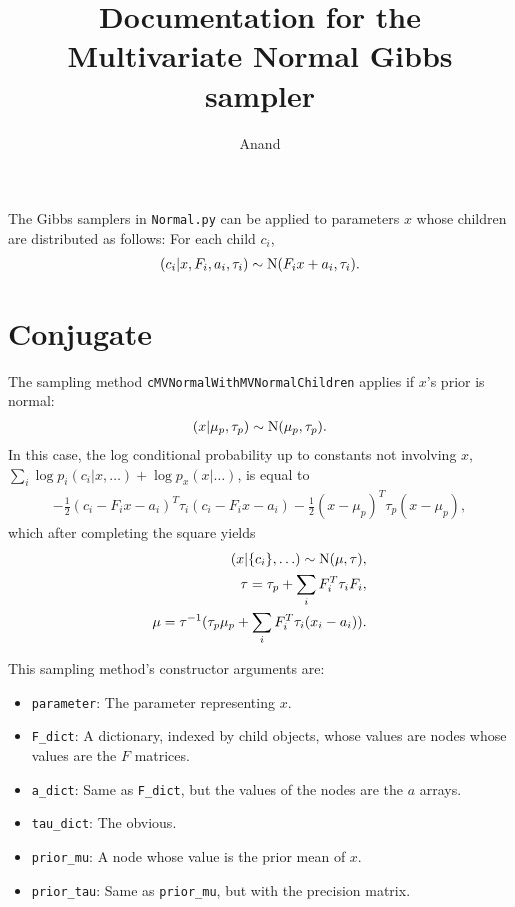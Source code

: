 \documentclass{article}
\begin{document}
\title{Documentation for the Multivariate Normal Gibbs sampler}
\author{Anand}
\maketitle

The Gibbs samplers in \texttt{Normal.py} can be applied to parameters $x$ whose children are distributed as follows: For each child $c_i$,
\begin{eqnarray*}
	(c_i | x, F_i, a_i, \tau_i) \sim \textup{N}(F_i x + a_i, \tau_i).
\end{eqnarray*}

\section{Conjugate}\label{conj}
The sampling method \texttt{cMVNormalWithMVNormalChildren} applies if $x$'s prior is normal:
\begin{eqnarray*}
	(x|\mu_p,\tau_p) \sim \textup{N}(\mu_p,\tau_p).
\end{eqnarray*}
In this case, the log conditional probability up to constants not involving $x$, $\sum_i \log p_i(c_i|x,\ldots) +\log p_x(x|\ldots)$, is equal to
\begin{eqnarray*}
	-\frac{1}{2}(c_i-F_ix-a_i)^T\tau_i(c_i-F_ix-a_i) - \frac{1}{2}(x-\mu_p)^T\tau_p(x-\mu_p),
\end{eqnarray*}
which after completing the square yields
\begin{eqnarray*}
	(x|\{c_i\},\ldots)\sim\textup{N}(\mu,\tau),\\
	\tau = \tau_p + \sum_i F_i^T \tau_i F_i,\\
	\mu = \tau^{-1}(\tau_p\mu_p + \sum_i F_i^T\tau_i(x_i-a_i)).
\end{eqnarray*}

This sampling method's constructor arguments are:
\begin{itemize}
	\item \texttt{parameter}: The parameter representing $x$. 
	\item \texttt{F\_dict}: A dictionary, indexed by child objects, whose values are nodes whose values are the $F$ matrices. 
	\item \texttt{a\_dict}: Same as \texttt{F\_dict}, but the values of the nodes are the $a$ arrays.
	\item \texttt{tau\_dict}: The obvious.
	\item \texttt{prior\_mu}: A node whose value is the prior mean of $x$.
	\item \texttt{prior\_tau}: Same as \texttt{prior\_mu}, but with the precision matrix.    
\end{itemize}
\end{document}

